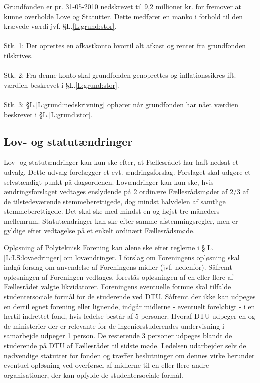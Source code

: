 \begin{list}
\item \label{L:grund:nedskrivning} Grundfonden er pr. 31-05-2010 nedskrevet til 9,2 millioner kr. for fremover at kunne overholde Love og
Statutter. Dette medfører en manko i forhold til den krævede værdi jvf. §L.\ref{L:grund:stor}.
\\
\\
Stk. 1: Der oprettes en afkastkonto hvortil alt afkast og renter fra grundfonden tilskrives.
\\
\\
Stk. 2: Fra denne konto skal grundfonden genoprettes og inflationssikres ift. værdien beskrevet i §L.\ref{L:grund:stor}.
\\
\\
Stk. 3: §L.\ref{L:grund:nedskrivning} ophører når grundfonden har nået værdien beskrevet i §L.\ref{L:grund:stor}.





\subsection{Lov- og statutændringer}
\item \label{L:LS:lovaedringer} Lov- og statutændringer kan kun ske efter, at Fællesrådet har haft nedsat et udvalg. Dette udvalg forelægger et evt. ændringsforslag. Forslaget skal udgøre et selvstændigt punkt på dagsordenen. Lovændringer kan kun ske, hvis ændringsforslaget vedtages enslydende på 2 ordinære Fællesrådsmøder af 2/3 af de tilstedeværende stemmeberettigede, dog mindst halvdelen af samtlige stemmeberettigede. Det skal ske med mindst en og højst tre måneders mellemrum. Statutændringer kan ske efter samme afstemningsregler, men er gyldige efter vedtagelse på et enkelt ordinært Fællesrådsmøde.

\item \label{L:LS:oploesning} Opløsning af Polyteknisk Forening kan alene ske efter reglerne i § L.\ref{L:LS:lovaedringer} om lovændringer. I forslag om Foreningens opløsning skal indgå forslag om anvendelse af Foreningens midler (jvf. nedenfor). Såfremt opløsningen af Foreningen vedtages, forestås opløsningen af en eller flere af Fællesrådet valgte likvidatorer. Foreningens eventuelle formue skal tilfalde studentersociale formål for de studerende ved DTU. Såfremt der ikke kan udpeges en dertil egnet forening eller lignende, indgår midlerne - eventuelt foreløbigt - i en hertil indrettet fond, hvis ledelse består af 5 personer. Hvoraf DTU udpeger en og de ministerier der er relevante for de ingeniørstuderendes undervisning i samarbejde udpeger 1 person. De resterende 3 personer udpeges blandt de studerende på DTU af Fællesrådet til sidste møde. Ledelsen udarbejder selv de nødvendige statutter for fonden og træffer beslutninger om dennes virke herunder eventuel opløsning ved overførsel af midlerne til en eller flere andre organisationer, der kan opfylde de studentersociale formål.


\end{list}
